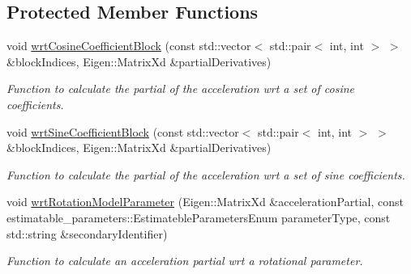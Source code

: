 \subsection*{Protected Member Functions}
\begin{DoxyCompactItemize}
\item 
void \hyperlink{classtudat_1_1acceleration__partials_1_1SphericalHarmonicsGravityPartial_a2b5eb89afa2612b063dfc0fbcb8784ef}{wrt\+Cosine\+Coefficient\+Block} (const std\+::vector$<$ std\+::pair$<$ int, int $>$ $>$ \&block\+Indices, Eigen\+::\+Matrix\+Xd \&partial\+Derivatives)
\begin{DoxyCompactList}\small\item\em Function to calculate the partial of the acceleration wrt a set of cosine coefficients. \end{DoxyCompactList}\item 
void \hyperlink{classtudat_1_1acceleration__partials_1_1SphericalHarmonicsGravityPartial_aa3edb5f17386c2e3274c8da5d1b52a4a}{wrt\+Sine\+Coefficient\+Block} (const std\+::vector$<$ std\+::pair$<$ int, int $>$ $>$ \&block\+Indices, Eigen\+::\+Matrix\+Xd \&partial\+Derivatives)
\begin{DoxyCompactList}\small\item\em Function to calculate the partial of the acceleration wrt a set of sine coefficients. \end{DoxyCompactList}\item 
void \hyperlink{classtudat_1_1acceleration__partials_1_1SphericalHarmonicsGravityPartial_aef8a46d7ddbe55f690556eee4483b858}{wrt\+Rotation\+Model\+Parameter} (Eigen\+::\+Matrix\+Xd \&acceleration\+Partial, const estimatable\+\_\+parameters\+::\+Estimateble\+Parameters\+Enum parameter\+Type, const std\+::string \&secondary\+Identifier)
\begin{DoxyCompactList}\small\item\em Function to calculate an acceleration partial wrt a rotational parameter. \end{DoxyCompactList}\end{DoxyCompactItemize}
